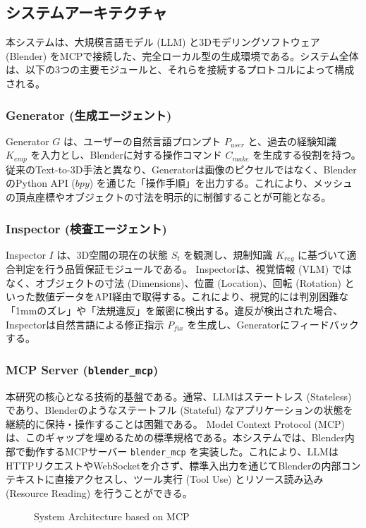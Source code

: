 \documentclass{deimj}
\begin{document}
\subsection{システムアーキテクチャ}
本システムは、大規模言語モデル (LLM) と3Dモデリングソフトウェア (Blender) をMCPで接続した、完全ローカル型の生成環境である。システム全体は、以下の3つの主要モジュールと、それらを接続するプロトコルによって構成される。

\subsubsection{Generator (生成エージェント)}
Generator $G$ は、ユーザーの自然言語プロンプト $P_{user}$ と、過去の経験知識 $K_{emp}$ を入力とし、Blenderに対する操作コマンド $C_{make}$ を生成する役割を持つ。
従来のText-to-3D手法と異なり、Generatorは画像のピクセルではなく、BlenderのPython API ($bpy$) を通じた「操作手順」を出力する。これにより、メッシュの頂点座標やオブジェクトの寸法を明示的に制御することが可能となる。

\subsubsection{Inspector (検査エージェント)}
Inspector $I$ は、3D空間の現在の状態 $S_t$ を観測し、規制知識 $K_{reg}$ に基づいて適合判定を行う品質保証モジュールである。
Inspectorは、視覚情報 (VLM) ではなく、オブジェクトの寸法 (Dimensions)、位置 (Location)、回転 (Rotation) といった数値データをAPI経由で取得する。これにより、視覚的には判別困難な「1mmのズレ」や「法規違反」を厳密に検出する。違反が検出された場合、Inspectorは自然言語による修正指示 $P_{fix}$ を生成し、Generatorにフィードバックする。

\subsubsection{MCP Server (\texttt{blender\_mcp})}
本研究の核心となる技術的基盤である。通常、LLMはステートレス (Stateless) であり、Blenderのようなステートフル (Stateful) なアプリケーションの状態を継続的に保持・操作することは困難である。
Model Context Protocol (MCP) は、このギャップを埋めるための標準規格である。本システムでは、Blender内部で動作するMCPサーバー \texttt{blender\_mcp} を実装した。これにより、LLMはHTTPリクエストやWebSocketを介さず、標準入出力を通じてBlenderの内部コンテキストに直接アクセスし、ツール実行 (Tool Use) とリソース読み込み (Resource Reading) を行うことができる。

\begin{figure}[t]
 \centering
 \caption{System Architecture based on MCP}
 \label{fig:architecture}
\end{figure}
\end{document}
